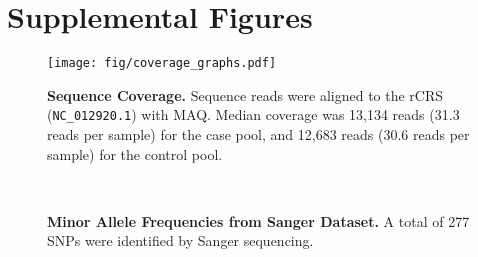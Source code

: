 \chapter{Supplemental Figures}

\begin{landscape}
\begin{figure}
  \begin{center}
    \texttt{[image: fig/coverage\_graphs.pdf]}
  \end{center}
  \caption[Short-Read Sequence Coverage of mtDNA]{
    \textbf{Sequence Coverage.} Sequence reads were aligned to the rCRS (\texttt{NC\_012920.1}) with MAQ.  Median coverage was 13,134 reads (31.3 reads per sample) for the case pool, and 12,683 reads (30.6 reads per sample) for the control pool.
  }
  \label{}
\end{figure}
\end{landscape}

\begin{landscape}
\begin{figure}
  \begin{center}
    \\
  \end{center}
  \caption[Control Region MAF Distribution from Sanger Sequencing]{
    \textbf{Minor Allele Frequencies from Sanger Dataset.}  A total of 277 SNPs were identified by Sanger sequencing.
  }
  \label{}
\end{figure}
\end{landscape}